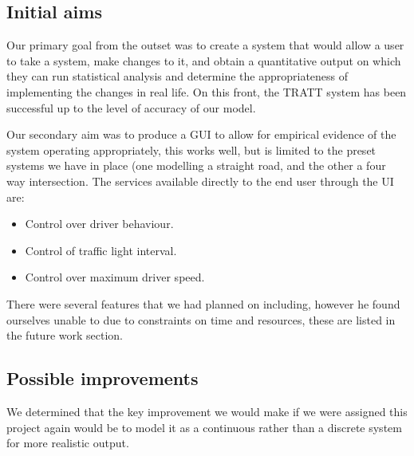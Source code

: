 	\subsection{Initial aims}
    	Our primary goal from the outset was to create a system that would allow a user to take a system, make changes to it, and obtain a quantitative output on which they can run statistical analysis and determine the appropriateness of implementing the changes in real life. On this front, the TRATT system has been successful up to the level of accuracy of our model.
        
        Our secondary aim was to produce a GUI to allow for empirical evidence of the system operating appropriately, this works well, but is limited to the preset systems we have in place (one modelling a straight road, and the other a four way intersection. The services available directly to the end user through the UI are:
        \begin{itemize}
        	\item Control over driver behaviour.
            \item Control of traffic light interval.
            \item Control over maximum driver speed.
        \end{itemize}

	There were several features that we had planned on including, however he found ourselves unable to due to constraints on time and resources, these are listed in the future work section.
    
	\subsection{Possible improvements}
    	We determined that the key improvement we would make if we were assigned this project again would be to model it as a continuous rather than a discrete system for more realistic output.
        
